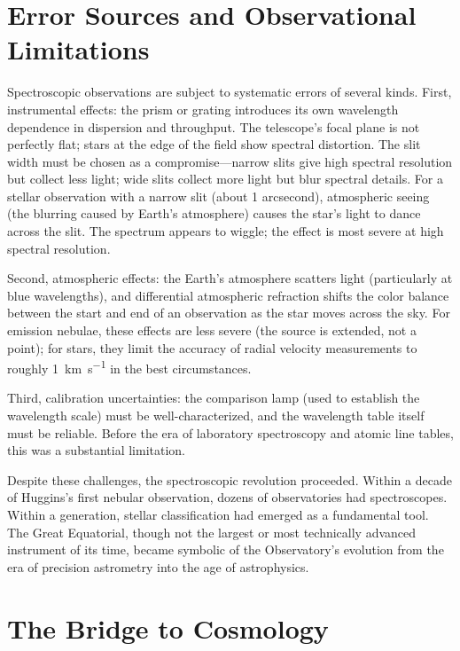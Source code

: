 \section{Error Sources and Observational Limitations}

Spectroscopic observations are subject to systematic errors of several kinds. First, instrumental effects: the prism or grating introduces its own wavelength dependence in dispersion and throughput. The telescope's focal plane is not perfectly flat; stars at the edge of the field show spectral distortion. The slit width must be chosen as a compromise—narrow slits give high spectral resolution but collect less light; wide slits collect more light but blur spectral details. For a stellar observation with a narrow slit (about 1 arcsecond), atmospheric seeing (the blurring caused by Earth's atmosphere) causes the star's light to dance across the slit. The spectrum appears to wiggle; the effect is most severe at high spectral resolution.

Second, atmospheric effects: the Earth's atmosphere scatters light (particularly at blue wavelengths), and differential atmospheric refraction shifts the color balance between the start and end of an observation as the star moves across the sky. For emission nebulae, these effects are less severe (the source is extended, not a point); for stars, they limit the accuracy of radial velocity measurements to roughly \SI{1}{\kilo\meter\per\second} in the best circumstances.

Third, calibration uncertainties: the comparison lamp (used to establish the wavelength scale) must be well-characterized, and the wavelength table itself must be reliable. Before the era of laboratory spectroscopy and atomic line tables, this was a substantial limitation.

Despite these challenges, the spectroscopic revolution proceeded. Within a decade of Huggins's first nebular observation, dozens of observatories had spectroscopes. Within a generation, stellar classification had emerged as a fundamental tool. The Great Equatorial, though not the largest or most technically advanced instrument of its time, became symbolic of the Observatory's evolution from the era of precision astrometry into the age of astrophysics.

\section{The Bridge to Cosmology}

